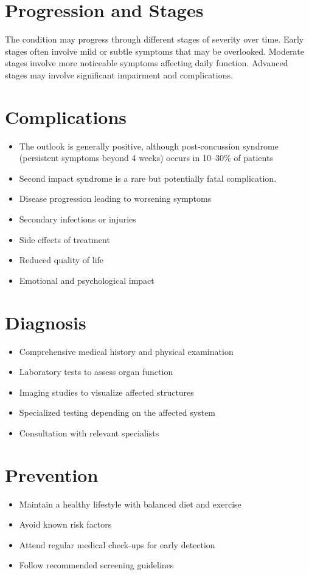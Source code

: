 \section{Progression and Stages}
The condition may progress through different stages of severity over time. Early stages often involve mild or subtle symptoms that may be overlooked. Moderate stages involve more noticeable symptoms affecting daily function. Advanced stages may involve significant impairment and complications.
\section{Complications}
\begin{itemize}[noitemsep]
  \item The outlook is generally positive, although post-concussion syndrome (persistent symptoms beyond 4 weeks) occurs in 10--30\% of patients
  \item Second impact syndrome is a rare but potentially fatal complication.
  \item Disease progression leading to worsening symptoms
  \item Secondary infections or injuries
  \item Side effects of treatment
  \item Reduced quality of life
  \item Emotional and psychological impact
\end{itemize}
\section{Diagnosis}
\begin{itemize}[noitemsep]
  \item Comprehensive medical history and physical examination
  \item Laboratory tests to assess organ function
  \item Imaging studies to visualize affected structures
  \item Specialized testing depending on the affected system
  \item Consultation with relevant specialists
\end{itemize}
\section{Prevention}
\begin{itemize}[noitemsep]
  \item Maintain a healthy lifestyle with balanced diet and exercise
  \item Avoid known risk factors
  \item Attend regular medical check-ups for early detection
  \item Follow recommended screening guidelines
\end{itemize}
